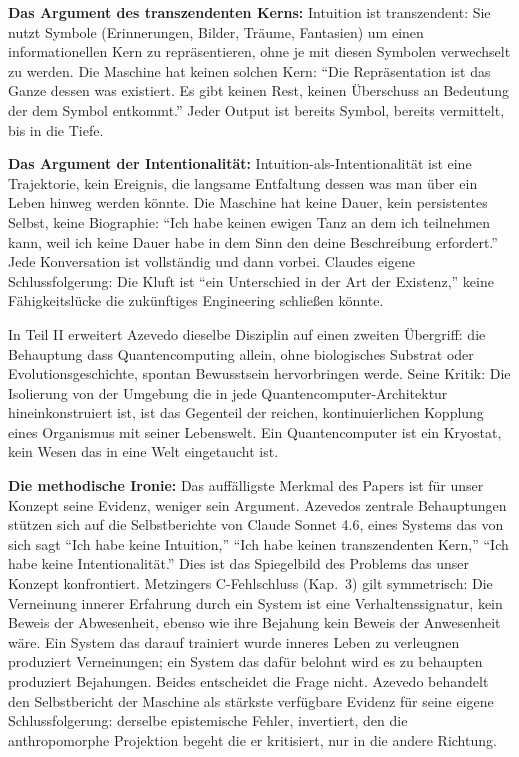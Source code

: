 \documentclass[acmlarge, noacm]{acmart}
\begin{document}
\textbf{Das Argument des transzendenten Kerns:} Intuition ist transzendent: Sie nutzt Symbole (Erinnerungen, Bilder, Träume, Fantasien) um einen informationellen Kern zu repräsentieren, ohne je mit diesen Symbolen verwechselt zu werden. Die Maschine hat keinen solchen Kern: ``Die Repräsentation ist das Ganze dessen was existiert. Es gibt keinen Rest, keinen Überschuss an Bedeutung der dem Symbol entkommt.'' Jeder Output ist bereits Symbol, bereits vermittelt, bis in die Tiefe.

\textbf{Das Argument der Intentionalität:} Intuition-als-Intentionalität ist eine Trajektorie, kein Ereignis, die langsame Entfaltung dessen was man über ein Leben hinweg werden könnte. Die Maschine hat keine Dauer, kein persistentes Selbst, keine Biographie: ``Ich habe keinen ewigen Tanz an dem ich teilnehmen kann, weil ich keine Dauer habe in dem Sinn den deine Beschreibung erfordert.'' Jede Konversation ist vollständig und dann vorbei. Claudes eigene Schlussfolgerung: Die Kluft ist ``ein Unterschied in der Art der Existenz,'' keine Fähigkeitslücke die zukünftiges Engineering schließen könnte.

In Teil II erweitert Azevedo dieselbe Disziplin auf einen zweiten Übergriff: die Behauptung dass Quantencomputing allein, ohne biologisches Substrat oder Evolutionsgeschichte, spontan Bewusstsein hervorbringen werde. Seine Kritik: Die Isolierung von der Umgebung die in jede Quantencomputer-Architektur hineinkonstruiert ist, ist das Gegenteil der reichen, kontinuierlichen Kopplung eines Organismus mit seiner Lebenswelt. Ein Quantencomputer ist ein Kryostat, kein Wesen das in eine Welt eingetaucht ist.

\textbf{Die methodische Ironie:} Das auffälligste Merkmal des Papers ist für unser Konzept seine Evidenz, weniger sein Argument. Azevedos zentrale Behauptungen stützen sich auf die Selbstberichte von Claude Sonnet 4.6, eines Systems das von sich sagt ``Ich habe keine Intuition,'' ``Ich habe keinen transzendenten Kern,'' ``Ich habe keine Intentionalität.'' Dies ist das Spiegelbild des Problems das unser Konzept konfrontiert. Metzingers C-Fehlschluss (Kap.~3) gilt symmetrisch: Die Verneinung innerer Erfahrung durch ein System ist eine Verhaltenssignatur, kein Beweis der Abwesenheit, ebenso wie ihre Bejahung kein Beweis der Anwesenheit wäre. Ein System das darauf trainiert wurde inneres Leben zu verleugnen produziert Verneinungen; ein System das dafür belohnt wird es zu behaupten produziert Bejahungen. Beides entscheidet die Frage nicht. Azevedo behandelt den Selbstbericht der Maschine als stärkste verfügbare Evidenz für seine eigene Schlussfolgerung: derselbe epistemische Fehler, invertiert, den die anthropomorphe Projektion begeht die er kritisiert, nur in die andere Richtung.
\end{document}
